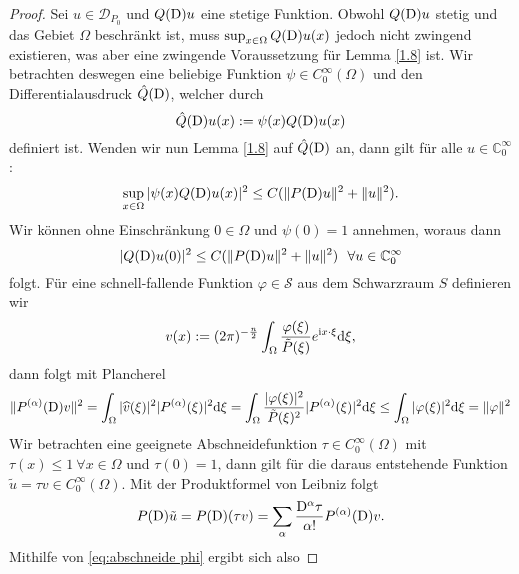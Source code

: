 \begin{proof}
\item Sei $u \in \mathcal{D}_{P_0}$ und $Q(\mathrm D)u$ eine stetige Funktion. Obwohl $Q(\mathrm D)u$ stetig und das Gebiet $\Omega$ beschränkt ist, muss $\sup_{x \in \Omega} Q(\mathrm D)u(x)$ jedoch nicht zwingend existieren, was aber eine zwingende Voraussetzung für Lemma \ref{1.8} ist. Wir betrachten deswegen eine beliebige Funktion $\psi \in C_0^{\infty} (\Omega)$ und den Differentialausdruck $\hat{Q}(\mathrm D)$, welcher durch
\begin{equation}
\hat{Q} (\mathrm D) u(x):=  \psi(x)Q(\mathrm D) u(x)
\end{equation}
definiert ist. Wenden wir nun Lemma \ref{1.8} auf $\hat{Q}(\mathrm D)$ an, dann gilt für alle $u \in \mathbb{C}_0^{\infty}$:
\begin{equation}
\sup_{x \in \Omega} | \psi(x) Q(\mathrm D)u(x)|^2 \leq C ( \Vert  P(\mathrm D)u\Vert^2 + \Vert u\Vert^2 ).
\end{equation}
Wir können ohne Einschränkung $0 \in \Omega$ und $\psi(0)=1$  annehmen, woraus dann 
\begin{equation}\label{eq:abschneide null}
|Q(\D)u(0)|^2 \leq C( \Vert  P(\D)u\Vert^2 + \Vert u\Vert^2 ) \ \  \forall u \in \mathbb{C}_0^{\infty}
\end{equation}
folgt. Für eine schnell-fallende Funktion $ \varphi \in \mathcal{S}$ aus dem Schwarzraum $S$ definieren wir
\begin{equation}
v(x):= (2 \pi)^{-\frac{n}{2}} \int_{\Omega} \frac{\varphi (\xi)}{\tilde{P}(\xi)}e^{\mathrm i x \cdot \xi} \mathrm{d}\xi,
\end{equation}
dann folgt mit Plancherel
\begin{equation}\label{eq:abschneide phi}
\Vert P^{(\alpha)}(\mathrm D)v \Vert^2 = \int_{\Omega} |\widehat{v}(\xi)|^2 |P^{(\alpha)}(\xi)|^2 \mathrm{d}\xi = \int_{\Omega} \frac{|\varphi(\xi)|^2}{\tilde{P}(\xi)^2} | P^{(\alpha)} (\xi)|^2 \mathrm{d}\xi \leq \int_{\Omega} |\varphi(\xi)|^2 \mathrm{d}\xi= \Vert \varphi \Vert^2
\end{equation}
Wir betrachten eine geeignete Abschneidefunktion $\tau \in C_0^{\infty}(\Omega)$ mit $\tau(x) \leq 1 \ \forall x \in \Omega$ und $\tau(0)=1$, dann gilt für die daraus entstehende Funktion $\tilde{u} = \tau v \in C_0^{\infty}(\Omega)$.
Mit der Produktformel von Leibniz folgt
\begin{equation}
P(\mathrm D)\tilde{u} = P(\mathrm D)(\tau v) = \sum_{\alpha} \frac{\mathrm D^{\alpha} \tau}{\alpha !} P^{(\alpha)}(\mathrm D) v.
\end{equation}
Mithilfe von \eqref{eq:abschneide phi} ergibt sich also

\end{proof}
